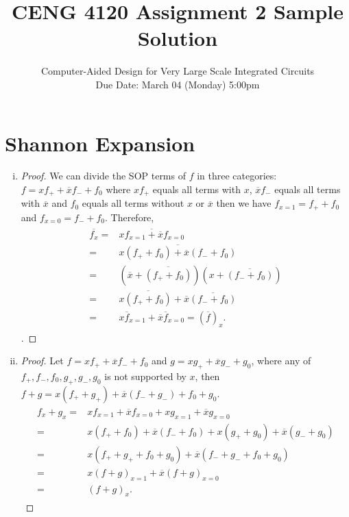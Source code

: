 \documentclass[acmlarge,screen=true,anonymous=false,11pt]{acmart}
\begin{document}
\title{CENG 4120 Assignment 2 Sample Solution}
\subtitle{Computer-Aided Design for Very Large Scale Integrated Circuits \\ Due Date: March 04 (Monday) 5:00pm}

\maketitle

\section{Shannon Expansion}
\begin{enumerate}[(i)]
    \item \begin{proof}
        We can divide the SOP terms of $f$ in three categories: $f = xf_+ + \overline{x}f_- + f_0$ where $xf_+$ equals all terms with $x$, $\overline{x}f_-$ equals all terms with $\overline{x}$ and $f_0$ equals all terms without $x$ or $\overline{x}$ then we have $f_{x = 1} = f_+ + f_0$ and $f_{x = 0} = f_- + f_0$.
        Therefore, \begin{align}
            \begin{aligned}
            \overline{f_x} = & \overline{xf_{x = 1} + \overline{x}f_{x = 0}}\\
            = & \overline{x (f_+ + f_0) + \overline{x}(f_- + f_0)}\\
            = & (\overline{x} + \overline{(f_+ + f_0)})(x + \overline{(f_- + f_0)})\\
            = & x\overline{(f_+ + f_0)} + \overline{x}\overline{(f_- + f_0)}\\
            = & x\overline{f}_{x = 1} + \overline{x}\overline{f}_{x = 0} = \left(\overline{f}\right)_x.
            \end{aligned}
        \end{align}.
    \end{proof}
    \item \begin{proof}
        Let $f = xf_+ + \overline{x}f_- + f_0$ and $g = xg_+ + \overline{x}g_- + g_0$, where any of $f_+, f_-, f_0, g_+, g_-, g_0$ is not supported by $x$, then $f + g = x(f_+ + g_+) + \overline{x}(f_- + g_-) + f_0 + g_0$.
        \begin{align}
            \begin{aligned}
            f_x + g_x = & xf_{x = 1} + \overline{x}f_{x = 0} + xg_{x = 1} + \overline{x}g_{x = 0}\\
            = & x(f_+ + f_0) + \overline{x}(f_- + f_0)+ x(g_+ + g_0) + \overline{x}(g_- + g_0)\\
            = & x(f_+ + g_+ + f_0 + g_0) + \overline{x}(f_- + g_- + f_0 + g_0)\\
            = & x(f + g)_{x = 1} + \overline{x}(f + g)_{x = 0}\\
            = & \left(f + g\right)_x.
            \end{aligned}
        \end{align}
    \end{proof}
\end{enumerate}
\end{document}

